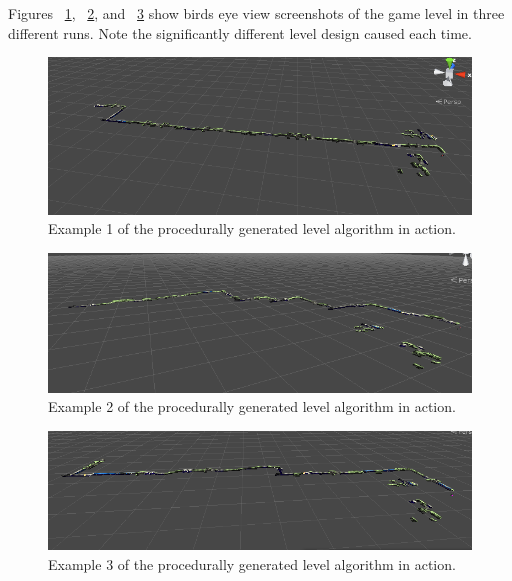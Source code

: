 \documentclass[a4paper,oneside]{memoir}
\begin{document}
	Figures ~\ref{fig:Algo1}, ~\ref{fig:Algo2}, and ~\ref{fig:Algo3} show birds eye view screenshots of the game level in three different runs. Note the significantly different level design caused each time.

	\begin{figure}[ht]
		\begin{center}
			\includegraphics[width=150mm]{../Screenshots/Appendices/section_generation}
			\caption{Example 1 of the procedurally generated level algorithm in action.}
			\label{fig:Algo1}
		\end{center}
	\end{figure}

	\begin{figure}[ht]
		\begin{center}
			\includegraphics[width=150mm]{../Screenshots/Appendices/section_generation_2}
			\caption{Example 2 of the procedurally generated level algorithm in action.}
			\label{fig:Algo2}
		\end{center}
	\end{figure}

	\begin{figure}[ht]
		\begin{center}
			\includegraphics[width=150mm]{../Screenshots/Appendices/section_generation_3}
			\caption{Example 3 of the procedurally generated level algorithm in action.}
			\label{fig:Algo3}
		\end{center}
	\end{figure}
\end{document}
